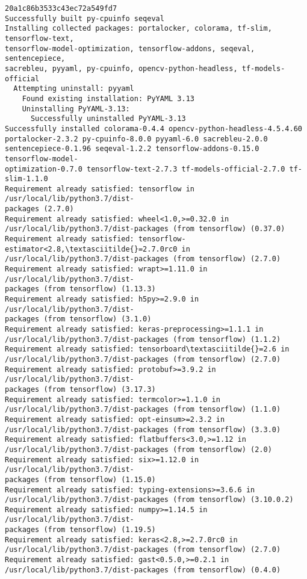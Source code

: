 \documentclass[11pt]{article}
\begin{document}
\begin{Verbatim}[commandchars=\\\{\}]
20a1c86b3533c43ec72a549fd7
Successfully built py-cpuinfo seqeval
Installing collected packages: portalocker, colorama, tf-slim, tensorflow-text,
tensorflow-model-optimization, tensorflow-addons, seqeval, sentencepiece,
sacrebleu, pyyaml, py-cpuinfo, opencv-python-headless, tf-models-official
  Attempting uninstall: pyyaml
    Found existing installation: PyYAML 3.13
    Uninstalling PyYAML-3.13:
      Successfully uninstalled PyYAML-3.13
Successfully installed colorama-0.4.4 opencv-python-headless-4.5.4.60
portalocker-2.3.2 py-cpuinfo-8.0.0 pyyaml-6.0 sacrebleu-2.0.0
sentencepiece-0.1.96 seqeval-1.2.2 tensorflow-addons-0.15.0 tensorflow-model-
optimization-0.7.0 tensorflow-text-2.7.3 tf-models-official-2.7.0 tf-slim-1.1.0
Requirement already satisfied: tensorflow in /usr/local/lib/python3.7/dist-
packages (2.7.0)
Requirement already satisfied: wheel<1.0,>=0.32.0 in
/usr/local/lib/python3.7/dist-packages (from tensorflow) (0.37.0)
Requirement already satisfied: tensorflow-estimator<2.8,\textasciitilde{}=2.7.0rc0 in
/usr/local/lib/python3.7/dist-packages (from tensorflow) (2.7.0)
Requirement already satisfied: wrapt>=1.11.0 in /usr/local/lib/python3.7/dist-
packages (from tensorflow) (1.13.3)
Requirement already satisfied: h5py>=2.9.0 in /usr/local/lib/python3.7/dist-
packages (from tensorflow) (3.1.0)
Requirement already satisfied: keras-preprocessing>=1.1.1 in
/usr/local/lib/python3.7/dist-packages (from tensorflow) (1.1.2)
Requirement already satisfied: tensorboard\textasciitilde{}=2.6 in
/usr/local/lib/python3.7/dist-packages (from tensorflow) (2.7.0)
Requirement already satisfied: protobuf>=3.9.2 in /usr/local/lib/python3.7/dist-
packages (from tensorflow) (3.17.3)
Requirement already satisfied: termcolor>=1.1.0 in
/usr/local/lib/python3.7/dist-packages (from tensorflow) (1.1.0)
Requirement already satisfied: opt-einsum>=2.3.2 in
/usr/local/lib/python3.7/dist-packages (from tensorflow) (3.3.0)
Requirement already satisfied: flatbuffers<3.0,>=1.12 in
/usr/local/lib/python3.7/dist-packages (from tensorflow) (2.0)
Requirement already satisfied: six>=1.12.0 in /usr/local/lib/python3.7/dist-
packages (from tensorflow) (1.15.0)
Requirement already satisfied: typing-extensions>=3.6.6 in
/usr/local/lib/python3.7/dist-packages (from tensorflow) (3.10.0.2)
Requirement already satisfied: numpy>=1.14.5 in /usr/local/lib/python3.7/dist-
packages (from tensorflow) (1.19.5)
Requirement already satisfied: keras<2.8,>=2.7.0rc0 in
/usr/local/lib/python3.7/dist-packages (from tensorflow) (2.7.0)
Requirement already satisfied: gast<0.5.0,>=0.2.1 in
/usr/local/lib/python3.7/dist-packages (from tensorflow) (0.4.0)

\end{Verbatim}
\end{document}
